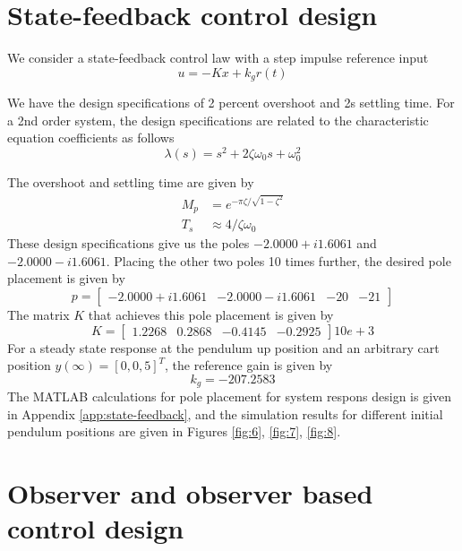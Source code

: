 \documentclass[12pt]{article}
\numberwithin{equation}{section}
\begin{document}
\section{State-feedback control design}

We consider a state-feedback control law with a step impulse reference input
\begin{equation}
    u = - K x + k_g r(t)
\end{equation}

We have the design specifications of 2 percent overshoot and 2s settling time. For a 2nd order system, the design specifications are related to the characteristic equation coefficients as follows
\begin{equation}
    \lambda(s) = s^2 + 2 \zeta \omega_0 s + \omega_0^2
\end{equation}

The overshoot and settling time are given by
\begin{align}
    M_p &= e^{-\pi \zeta / \sqrt{1 - \zeta^2}}\\
    T_s &\approx 4 / \zeta \omega_ 0
\end{align}
These design specifications give us the poles $-2.0000+i1.6061$ and $-2.0000-i1.6061$. Placing the other two poles 10 times further, the desired pole placement is given by
\begin{equation}
    p = 
    \begin{bmatrix}
        -2.0000+i1.6061 & -2.0000-i1.6061 & -20 & -21
    \end{bmatrix}
\end{equation}
The matrix $K$ that achieves this pole placement is given by
\begin{equation}
    K = 
    \begin{bmatrix}
        1.2268 & 0.2868 & -0.4145 & -0.2925
    \end{bmatrix}
    10e+3
\end{equation}
For a steady state response at the pendulum up position and an arbitrary cart position $y(\infty) = [0, 0,5]^T$, the reference gain is given by
\begin{equation}
    k_g = -207.2583
\end{equation}
The MATLAB calculations for pole placement for system respons design is given in Appendix \ref{app:state-feedback}, and the simulation results for different initial pendulum positions are given in Figures \ref{fig:6}, \ref{fig:7}, \ref{fig:8}.

\section{Observer and observer based control design}
\end{document}

